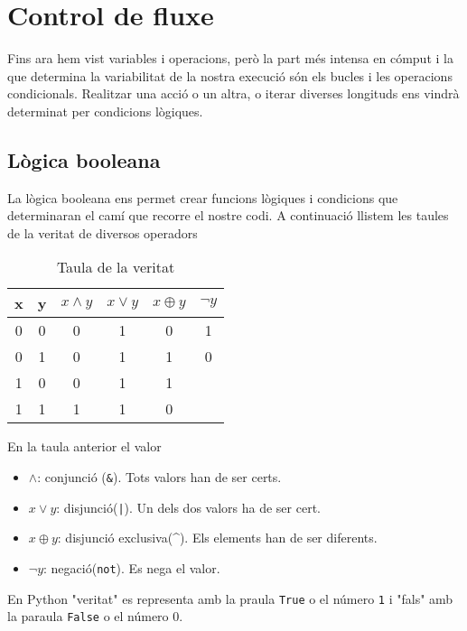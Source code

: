 \chapter{Control de fluxe}


Fins ara hem vist variables i operacions, però la part més intensa en cómput i la que determina la variabilitat de la nostra execució són els bucles i les operacions condicionals. Realitzar una acció o un altra, o iterar diverses longituds ens vindrà determinat per condicions lògiques.



\section{Lògica booleana}

La lògica booleana ens permet crear funcions lògiques i condicions que determinaran el camí que recorre el nostre codi. A continuació llistem les taules de la veritat de diversos operadors



\begin{table}[!h]
    \begin{centering}
    \begin{tabular}{cc|c|c|c|c|}
    x & y & $x \wedge y$ & $x \lor y$ & $x \oplus y$ & $\neg y$\\ \hline
    0 & 0 & 0 & 1 & 0 & 1 \\
    0 & 1 & 0 & 1 & 1 & 0 \\
    1 & 0 & 0 & 1 & 1 & \\
    1 & 1 & 1 & 1 & 0 &
    \end{tabular}
    \caption{Taula de la veritat}
    \label{tab:python-term}
    \end{centering}
\end{table}

En la taula anterior el valor

\begin{itemize}
\item $\wedge$: conjunció ({\tt \&}). Tots valors han de ser certs.
\item $x \lor y$: disjunció({\tt |}). Un dels dos valors ha de ser cert.
\item $x \oplus y$: disjunció exclusiva(\^{}). Els elements han de ser diferents.
\item $\neg y$: negació({\tt not}). Es nega el valor.
\end{itemize}

En Python "veritat" es representa amb la praula {\tt True} o el número {\tt 1} i "fals" amb la paraula {\tt False} o el número 0.

